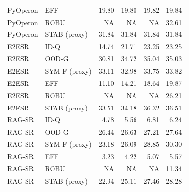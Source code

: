 \begin{tabular}{llrrrr}
PyOperon & EFF & 19.80 & 19.80 & 19.82 & 19.84 \\
PyOperon & ROBU & NA & NA & NA & 32.61 \\
PyOperon & STAB (proxy) & 31.84 & 31.84 & 31.84 & 31.84 \\
E2ESR & ID-Q & 14.74 & 21.71 & 23.25 & 23.25 \\
E2ESR & OOD-G & 30.81 & 34.72 & 35.04 & 35.03 \\
E2ESR & SYM-F (proxy) & 33.11 & 32.98 & 33.75 & 33.82 \\
E2ESR & EFF & 11.10 & 14.21 & 18.64 & 19.87 \\
E2ESR & ROBU & NA & NA & NA & 26.21 \\
E2ESR & STAB (proxy) & 33.51 & 34.18 & 36.32 & 36.51 \\
RAG-SR & ID-Q & 4.78 & 5.56 & 6.81 & 6.24 \\
RAG-SR & OOD-G & 26.44 & 26.63 & 27.21 & 27.64 \\
RAG-SR & SYM-F (proxy) & 23.18 & 26.09 & 28.85 & 30.30 \\
RAG-SR & EFF & 3.23 & 4.22 & 5.07 & 5.57 \\
RAG-SR & ROBU & NA & NA & NA & 11.34 \\
RAG-SR & STAB (proxy) & 22.94 & 25.11 & 27.46 & 28.28 \\
\bottomrule
\end{tabular}
